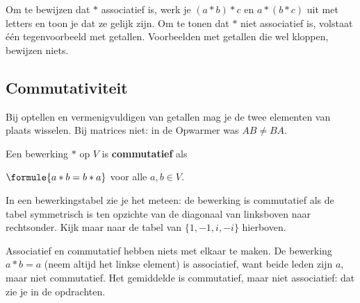 
\begin{werkwijze}
Om te bewijzen dat $\ast$ associatief is, werk je $(a \ast b) \ast c$ en $a \ast (b \ast c)$ uit met letters en toon je dat ze gelijk zijn. Om te tonen dat $\ast$ niet associatief is, volstaat één tegenvoorbeeld met getallen. Voorbeelden met getallen die wel kloppen, bewijzen niets.
\end{werkwijze}

\begin{oefeningen}
\end{oefeningen}

\subsection{Commutativiteit}

Bij optellen en vermenigvuldigen van getallen mag je de twee elementen van plaats wisselen. Bij matrices niet: in de Opwarmer was $AB \neq BA$.

\begin{theorie}
Een bewerking $\ast$ op $V$ is \textbf{\textcolor{accent}{commutatief}} als

\vspace{1mm}
\qquad $\formule{a \ast b = b \ast a}$ \qquad voor alle $a, b \in V$.
\end{theorie}

In een bewerkingstabel zie je het meteen: de bewerking is commutatief als de tabel symmetrisch is ten opzichte van de diagonaal van linksboven naar rechtsonder. Kijk maar naar de tabel van $\{1, -1, i, -i\}$ hierboven.

Associatief en commutatief hebben niets met elkaar te maken. De bewerking $a \ast b = a$ (neem altijd het linkse element) is associatief, want beide leden zijn $a$, maar niet commutatief. Het gemiddelde is commutatief, maar niet associatief: dat zie je in de opdrachten.

